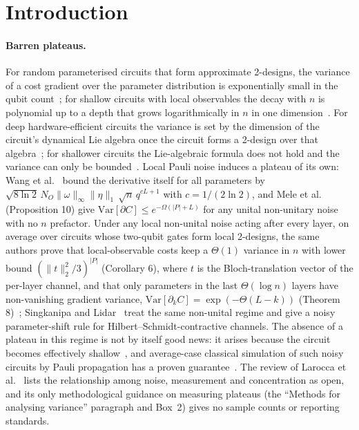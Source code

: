\documentclass[aps,prxquantum,reprint,superscriptaddress,nofootinbib,longbibliography,amsmath,amssymb]{revtex4-2}
\newcommand{\Var}{\mathrm{Var}}
\begin{document}
\maketitle

\section{Introduction}\label{sec:intro}

\paragraph{Barren plateaus.} For random parameterised circuits that form approximate 2-designs, the variance of a cost gradient over the parameter distribution is exponentially small in the qubit count~\cite{McClean2018}; for shallow circuits with local observables the decay with $n$ is polynomial up to a depth that grows logarithmically in $n$ in one dimension~\cite{Cerezo2021}. For deep hardware-efficient circuits the variance is set by the dimension of the circuit's dynamical Lie algebra once the circuit forms a 2-design over that algebra~\cite{Ragone2024,Fontana2024,Larocca2025}; for shallower circuits the Lie-algebraic formula does not hold and the variance can only be bounded~\cite{Larocca2025}. Local Pauli noise induces a plateau of its own: Wang et al.~\cite{Wang2021} bound the derivative itself for all parameters by $\sqrt{8\ln 2}\,N_O\|\omega\|_\infty\|\eta\|_1\,\sqrt{n}\,q^{cL+1}$ with $c = 1/(2\ln 2)$, and Mele et al.~\cite{Mele2026} (Proposition 10) give $\Var[\partial C] \leq e^{-\Omega(|P|+L)}$ for any unital non-unitary noise with no $n$ prefactor. Under any local non-unital noise acting after every layer, on average over circuits whose two-qubit gates form local 2-designs, the same authors prove that local-observable costs keep a $\Theta(1)$ variance in $n$ with lower bound $(\|t\|_2^2/3)^{|P|}$ (Corollary 6), where $t$ is the Bloch-translation vector of the per-layer channel, and that only parameters in the last $\Theta(\log n)$ layers have non-vanishing gradient variance, $\Var[\partial_k C] = \exp(-\Theta(L-k))$ (Theorem 8)~\cite{Mele2026}; Singkanipa and Lidar~\cite{Singkanipa2025} treat the same non-unital regime and give a noisy parameter-shift rule for Hilbert--Schmidt-contractive channels. The absence of a plateau in this regime is not by itself good news: it arises because the circuit becomes effectively shallow~\cite{Mele2026}, and average-case classical simulation of such noisy circuits by Pauli propagation has a proven guarantee~\cite{Angrisani2026}. The review of Larocca et al.~\cite{Larocca2025} lists the relationship among noise, measurement and concentration as open, and its only methodological guidance on measuring plateaus (the ``Methods for analysing variance'' paragraph and Box~2) gives no sample counts or reporting standards.
\end{document}
